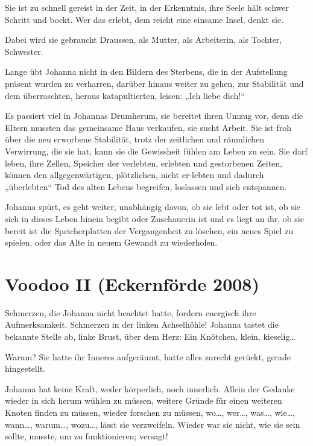 \documentclass[10pt,titlepage,a5paper]{book}
\begin{document}
Sie ist zu schnell gereist in der Zeit, in der Erkenntnis, ihre Seele hält schwer Schritt und bockt. Wer das erlebt, dem reicht eine einsame Insel, denkt sie.

Dabei wird sie gebraucht Draussen, als Mutter, als Arbeiterin, als Tochter, Schwester.

Lange übt Johanna nicht in den Bildern des Sterbens, die in der Aufstellung präsent wurden zu verharren, darüber hinaus weiter zu gehen, zur Stabilität und dem überraschten, heraus katapultierten, leisen: „Ich liebe dich!“

Es passiert viel in Johannas Drumherum, sie bereitet ihren Umzug vor, denn die Eltern mussten das gemeinsame Haus verkaufen, sie sucht Arbeit. Sie ist froh über die neu erworbene Stabilität, trotz der zeitlichen und räumlichen Verwirrung, die sie hat, kann sie die Gewissheit fühlen am Leben zu sein. Sie darf leben, ihre Zellen, Speicher der verlebten, erlebten und gestorbenen Zeiten, können den allgegenwärtigen, plötzlichen, nicht er-lebten und dadurch „überlebten“ Tod des alten Lebens begreifen, loslassen und sich entspannen.

Johanna spürt, es geht weiter, unabhängig davon, ob sie lebt oder tot ist, ob sie sich in dieses Leben hinein begibt oder Zuschauerin ist und es liegt an ihr, ob sie bereit ist die Speicherplatten der Vergangenheit zu löschen, ein neues Spiel zu spielen, oder das Alte in neuem Gewandt zu wiederholen.



\section*{Voodoo II (Eckernförde 2008)}




Schmerzen, die Johanna nicht beachtet hatte, fordern energisch ihre Aufmerksamkeit. Schmerzen in der linken Achselhöhle! Johanna tastet die bekannte Stelle ab, linke Brust, über dem Herz: Ein Knötchen, klein, kieselig\dots 

Warum? Sie hatte ihr Inneres aufgeräumt, hatte alles zurecht gerückt, gerade hingestellt.

Johanna hat keine Kraft, weder körperlich, noch innerlich. Allein der Gedanke wieder in sich herum wühlen zu müssen, weitere Gründe für einen weiteren Knoten finden zu müssen, wieder forschen zu müssen, wo\dots , wer\dots , was\dots , wie\dots , wann\dots , warum\dots , wozu\dots , lässt sie verzweifeln. Wieder war sie nicht, wie sie sein sollte, musste, um zu funktionieren; versagt!
\end{document}
